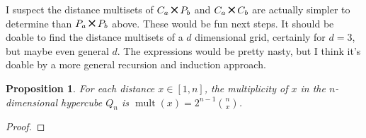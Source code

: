 \documentclass[12]{article}
\newcommand{\Cross}{\mathbin{\tikz [x=1.4ex,y=1.4ex,line width=.2ex] \draw (0,0) -- (1,1) (0,1) -- (1,0);}}
\DeclareMathOperator{\mult}{mult}
\newtheorem{prop}[thm]{Proposition}
\theoremstyle{definition}
\begin{document}
	I suspect the distance multisets of $C_a \Cross P_b$ and $C_a \Cross C_b$ are actually simpler to determine than $P_a \Cross P_b$ above.  These would be fun next steps.  It should be doable to find the distance multisets of a $d$ dimensional grid, certainly for $d=3$, but maybe even general $d$.  The expressions would be pretty nasty, but I think it's doable by a more general recursion and induction approach.
	\newpage
	\begin{prop}
		For each distance $x \in [1,n]$, the multiplicity of $x$ in the $n$-dimensional hypercube $Q_n$ is $\mult(x) = 2^{n-1}{n \choose x}$.
	\end{prop}

	\begin{proof}
		
		
		
		

\end{proof}
\end{document}
